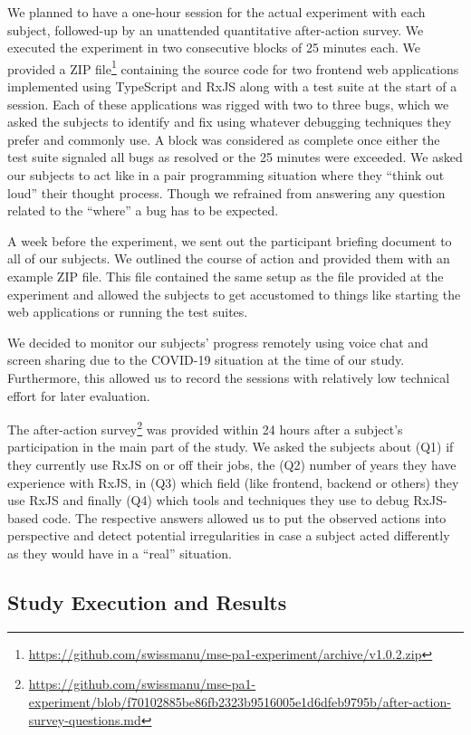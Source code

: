 \documentclass[sigplan,screen,review]{acmart}
\begin{document}
We planned to have a one-hour session for the actual experiment with each subject, followed-up by an unattended quantitative after-action survey. We executed the experiment in two consecutive blocks of 25 minutes each. We provided a ZIP file\footnote{\url{https://github.com/swissmanu/mse-pa1-experiment/archive/v1.0.2.zip}} containing the source code for two frontend web applications implemented using TypeScript and RxJS along with a test suite at the start of a session. Each of these applications was rigged with two to three bugs, which we asked the subjects to identify and fix using whatever debugging techniques they prefer and commonly use. A block was considered as complete once either the test suite signaled all bugs as resolved or the 25 minutes were exceeded. We asked our subjects to act like in a pair programming situation where they ``think out loud'' their thought process. Though we refrained from answering any question related to the ``where'' a bug has to be expected.

A week before the experiment, we sent out the participant briefing document to all of our subjects. We outlined the course of action and provided them with an example ZIP file. This file contained the same setup as the file provided at the experiment and allowed the subjects to get accustomed to things like starting the web applications or running the test suites.

We decided to monitor our subjects' progress remotely using voice chat and screen sharing due to the COVID-19 situation at the time of our study. Furthermore, this allowed us to record the sessions with relatively low technical effort for later evaluation.

The after-action survey\footnote{\url{https://github.com/swissmanu/mse-pa1-experiment/blob/f70102885be86fb2323b9516005e1d6dfeb9795b/after-action-survey-questions.md}} was provided within 24 hours after a subject's participation in the main part of the study. We asked the subjects about (Q1) if they currently use RxJS on or off their jobs, the (Q2) number of years they have experience with RxJS, in (Q3) which field (like frontend, backend or others) they use RxJS and finally (Q4) which tools and techniques they use to debug RxJS-based code. The respective answers allowed us to put the observed actions into perspective and detect potential irregularities in case a subject acted differently as they would have in a ``real'' situation.

\subsection{Study Execution and Results}
\end{document}
